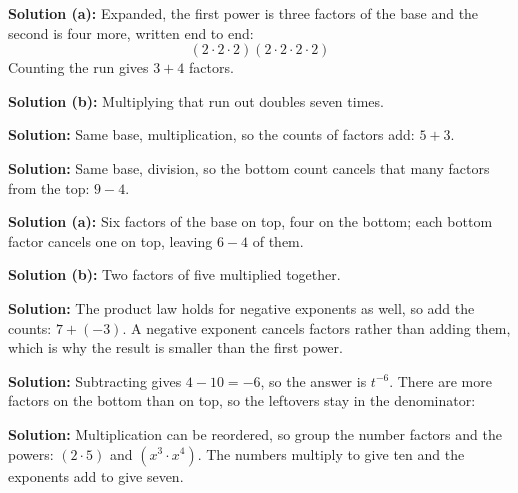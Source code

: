 \documentclass[12pt]{article}
\begin{document}




\textbf{Solution (a):} \quad Expanded, the first power is three factors of the base and the
second is four more, written end to end:
\[ (2 \cdot 2 \cdot 2)(2 \cdot 2 \cdot 2 \cdot 2) \]
Counting the run gives $3 + 4$ factors. 

\textbf{Solution (b):} \quad Multiplying that run out doubles seven times. 


\textbf{Solution:} \quad Same base, multiplication, so the counts of factors add:
$5 + 3$. 


\textbf{Solution:} \quad Same base, division, so the bottom count cancels that many
factors from the top: $9 - 4$. 


\textbf{Solution (a):} \quad Six factors of the base on top, four on the bottom; each
bottom factor cancels one on top, leaving $6 - 4$ of them. 

\textbf{Solution (b):} \quad Two factors of five multiplied together. 


\textbf{Solution:} \quad The product law holds for negative exponents as well, so add the
counts: $7 + (-3)$. A negative exponent cancels factors rather than adding them, which is
why the result is smaller than the first power. 


\textbf{Solution:} \quad Subtracting gives $4 - 10 = -6$, so the answer is $t^{-6}$. There
are more factors on the bottom than on top, so the leftovers stay in the denominator:


\textbf{Solution:} \quad Multiplication can be reordered, so group the number factors and
the powers: $(2 \cdot 5)$ and $(x^3 \cdot x^4)$. The numbers multiply to give ten and the
exponents add to give seven. 
\end{document}
